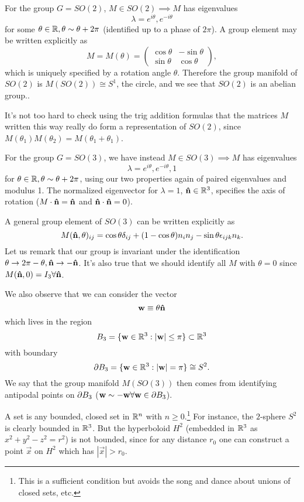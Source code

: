 \begin{exm}
For the group $G=SO(2)$, $M\in SO(2)\implies M$ has eigenvalues
$$\lambda=e^{i\theta},e^{-i\theta}$$ for some $\theta\in\mathbb{R},\theta \sim \theta+2\pi$ (identified up to a phase of $2\pi$). A group element may be written explicitly as
$$M=M(\theta)=\begin{pmatrix}
\cos\theta & -\sin\theta\\
\sin\theta & \cos\theta
\end{pmatrix},$$
which is uniquely specified by a rotation angle $\theta$. Therefore the group manifold of $SO(2)$ is $M(SO(2))\cong S^1$, the circle, and we see that $SO(2)$ is an abelian group..

It's not too hard to check using the trig addition formulas that the matrices $M$ written this way really do form a representation of $SO(2)$, since $M(\theta_1) M(\theta_2)=M(\theta_1+\theta_1)$.
\end{exm}
\begin{exm}
For the group $G=SO(3)$, we have instead $M\in SO(3)\implies M$ has eigenvalues
$$\lambda=e^{i\theta},e^{-i\theta},1$$ for $\theta\in \mathbb{R},\theta \sim \theta+2\pi$, using our two properties again of paired eigenvalues and modulus 1.
The normalized eigenvector for $\lambda=1$, $\mathbf{\hat{n}} \in \mathbb{R}^3$, specifies the axis of rotation ($M \cdot \mathbf{\hat{n}} = \mathbf{\hat{n}}$ and $\mathbf{\hat{n}} \cdot \mathbf{\hat{n}} = 0$).

A general group element of $SO(3)$ can be written explicitly as
\begin{equation}
M(\mathbf{\hat{n}}, \theta)_{ij} = \cos\theta\delta_{ij} +(1-\cos\theta)n_i n_j - \sin\theta \epsilon_{ijk} n_k.
\end{equation}
Let us remark that our group is invariant under the identification $\theta\to 2\pi-\theta, \mathbf{\hat{n}} \to -\mathbf{\hat{n}}$. It's also true that we should identify all $M$ with $\theta=0$ since $M(\mathbf{\hat{n}}, 0)= I_3 \forall \mathbf{\hat{n}}$.

We also observe that we can consider the vector
$$\boldsymbol{\mathbf{w}}\equiv\theta \mathbf{\hat{n}}$$ which lives in the region
$$B_3=\{\boldsymbol{\mathbf{w}}\in \mathbb{R}^3: |\boldsymbol{\mathbf{w}}|\leq \pi\} \subset \mathbb{R}^3$$
with boundary
$$\partial B_3 = \{\boldsymbol{\mathbf{w}}\in \mathbb{R}^3: |\boldsymbol{\mathbf{w}}|=\pi\} \cong S^2.$$
We say that the group manifold $M(SO(3))$ then comes from identifying antipodal points on $\partial B_3$ ($\boldsymbol{\mathbf{w}} \sim -\boldsymbol{\mathbf{w}} \forall \boldsymbol{\mathbf{w}} \in \partial B_3$).
\end{exm}

\begin{defn}
A  set is any bounded, closed set in $\mathbb{R}^n$ with $n\geq 0$.\footnote{This is a sufficient condition but avoids the song and dance about unions of closed sets, etc.} For instance, the $2$-sphere $S^2$ is clearly bounded in $\mathbb{R}^3$. But the hyperboloid $H^2$ (embedded in $\mathbb{R}^3$ as $x^2+y^2-z^2 =r^2$) is not bounded, since for any distance $r_0$ one can construct a point $\vec{x}$ on $H^2$ which has $|\vec{x}|>r_0$.
\end{defn}

